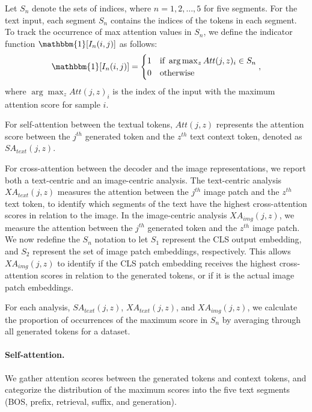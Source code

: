 Let $S_n$ denote the sets of indices, where $n = 1, 2, \ldots, 5$ for five segments. For the text input, each segment $S_n$ contains the indices of the tokens in each segment. To track the occurrence of max attention values in $S_n$,
we define the indicator function $\mathbbm{1}[I_n(i, j)]$ as follows:
\begin{equation}
\mathbbm{1}[I_n(i, j)] = \begin{cases}
1 & \text{if } \arg\max_z Att(j,z)_i \in S_n \\
0 & \text{otherwise}
\end{cases},
\label{eq:indicator}
\end{equation}
where $\arg\max_z Att(j,z)_i$ is the index of the input with the maximum attention score for sample $i$.

For self-attention between the textual tokens, $Att(j,z)$ represents the attention score between the $j^{th}$ generated token and the $z^{th}$ text context token, denoted as $SA_{text}(j, z)$. 


For cross-attention between the decoder and the image representations, we report both a text-centric and an image-centric analysis. The text-centric analysis $XA_{text}(j, z)$ measures the attention between the $j^{th}$ image patch and the $z^{th}$ text token, to identify which segments of the text have the highest cross-attention scores in relation to the image. In the image-centric analysis $XA_{img}(j, z)$, we measure the attention between the $j^{th}$ generated token and the $z^{th}$ image patch. We now redefine the $S_n$ notation to let $S_1$ represent the CLS output embedding, and $S_2$ represent the set of image patch embeddings, respectively. This allows $XA_{img}(j, z)$ to identify if the CLS patch embedding receives the highest cross-attention scores in relation to the generated tokens, or if it is the actual image patch embeddings.

For each analysis, $SA_{text}(j, z)$, $XA_{text}(j, z)$, and $XA_{img}(j, z)$, we calculate the proportion of occurrences of the maximum score in $S_n$ by averaging through all generated tokens for a dataset.

\paragraph{Self-attention.} %
\label{para:sa}



    
    

We gather attention scores between the generated tokens and context tokens, and categorize the distribution of the maximum scores into the five text segments (BOS, prefix, retrieval, suffix, and generation).



